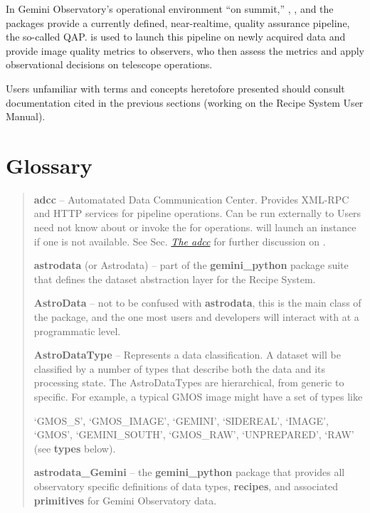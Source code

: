 \documentclass[letterpaper,10pt,english]{sphinxmanual}
\begin{document}
In Gemini Observatory's operational environment ``on summit,'' ,
, and the  packages provide a currently defined,
near-realtime, quality assurance pipeline, the so-called QAP.  is used
to launch this pipeline on newly acquired data and provide image quality metrics
to observers, who then assess the metrics and apply observational decisions on
telescope operations.

Users unfamiliar with terms and concepts heretofore presented should consult
documentation cited in the previous sections (working on the Recipe System User
Manual).


\section{Glossary}
\label{intro:glossary}\begin{quote}

\textbf{adcc} -- Automatated Data Communication Center. Provides XML-RPC and HTTP
services for pipeline operations. Can be run externally to  Users
need not know about or invoke the  for  operations.
 will launch an  instance if one is not available. See
Sec. {\hyperref[discuss:adcc]{\emph{The adcc}}} for further discussion on .

\textbf{astrodata} (or Astrodata) -- part of the \textbf{gemini\_python} package suite
that defines the dataset abstraction layer for the Recipe System.

\textbf{AstroData} -- not to be confused with \textbf{astrodata}, this is the main class
of the  package, and the one most users and developers will
interact with at a programmatic level.

\textbf{AstroDataType} -- Represents a data classification. A dataset will be
classified by a number of types that describe both the data and its processing
state. The AstroDataTypes are hierarchical, from generic to specific.  For
example, a typical GMOS image might have a set of types like

`GMOS\_S', `GMOS\_IMAGE', `GEMINI', `SIDEREAL', `IMAGE', `GMOS', `GEMINI\_SOUTH',
`GMOS\_RAW', `UNPREPARED', `RAW' (see \textbf{types} below).

\textbf{astrodata\_Gemini} -- the \textbf{gemini\_python} package that provides all
observatory specific definitions of data types, \textbf{recipes}, and associated
\textbf{primitives} for Gemini Observatory data.


\end{quote}
\end{document}
